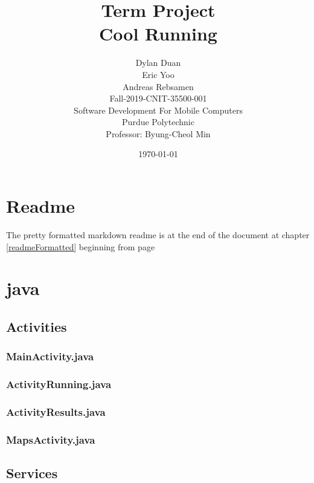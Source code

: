 \documentclass[11pt, titlepage ]{article}
\title{ Term Project\\
        Cool Running}
\author{
        Dylan Duan \\
        Eric Yoo \\
        Andreas Rebsamen \\
        Fall-2019-CNIT-35500-001\\
        Software Development For Mobile Computers\\
        Purdue Polytechnic\\
        Professor: Byung-Cheol Min
}
\date{\today}
\begin{document}
\begin{titlepage}
  \maketitle
\end{titlepage}

\tableofcontents
\clearpage

\section{Readme}
The pretty formatted markdown readme is at the end of the document at chapter \ref{readmeFormatted} beginning from page \pageref{readmeFormatted}


\clearpage

\section{java}
\subsection{Activities}
\subsubsection{MainActivity.java}

\subsubsection{ActivityRunning.java}

\subsubsection{ActivityResults.java}

\subsubsection{MapsActivity.java}


\clearpage

\subsection{Services}
\end{document}
